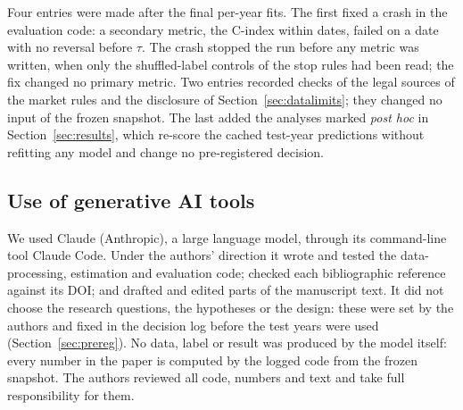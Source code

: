 Four entries were made after the final per-year fits. The first fixed a crash in the evaluation code:
a secondary metric, the C-index within dates, failed on a date with no reversal before $\tau$. The
crash stopped the run before any metric was written, when only the shuffled-label controls of the
stop rules had been read; the fix changed no primary metric. Two entries recorded checks of the
legal sources of the market rules and the disclosure of Section~\ref{sec:datalimits}; they changed
no input of the frozen snapshot. The last added the analyses marked \emph{post hoc} in
Section~\ref{sec:results}, which re-score the cached test-year predictions without refitting any
model and change no pre-registered decision.

\subsection{Use of generative AI tools}\label{sec:ai}

We used Claude (Anthropic), a large language model, through its command-line tool Claude Code.
Under the authors' direction it wrote and tested the data-processing, estimation and evaluation
code; checked each bibliographic reference against its DOI; and drafted and edited parts of the
manuscript text. It did not choose the research questions, the hypotheses or the design: these were
set by the authors and fixed in the decision log before the test years were used
(Section~\ref{sec:prereg}). No data, label or result was produced by the model itself: every number
in the paper is computed by the logged code from the frozen snapshot. The authors reviewed all code,
numbers and text and take full responsibility for them.
